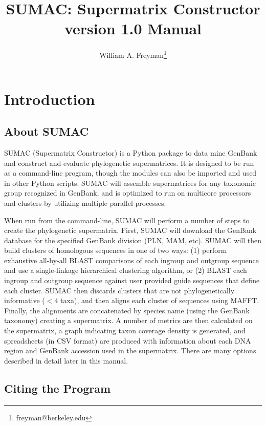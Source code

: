 \documentclass[10pt]{report}
\title{SUMAC: Supermatrix Constructor version 1.0 Manual}
\author{William A. Freyman\thanks{freyman@berkeley.edu}}
\affil{Department of Integrative Biology, University of California, Berkeley}
\date{}
\begin{document}
\maketitle

\tableofcontents


\chapter{Introduction}

\section{About SUMAC}

SUMAC (Supermatrix Constructor) is a Python package to 
data mine GenBank and construct
and evaluate phylogenetic supermatrices. 
It is designed to be run as a command-line program, though
the modules can also be imported and used in other Python scripts.
SUMAC will assemble
supermatrices for any taxonomic group recognized in GenBank,
and is optimized to run on multicore processors and clusters by utilizing multiple parallel processes.

When run from the command-line, SUMAC will perform a number of steps to create
the phylogenetic supermatrix. 
First, SUMAC will download the GenBank database for the specified GenBank division (PLN, MAM, etc).
SUMAC will then build clusters of homologous sequences in one of two ways:
(1) perform exhaustive all-by-all BLAST comparisons of each ingroup and outgroup sequence
and use a single-linkage hierarchical clustering algorithm, or
(2) BLAST each ingroup and outgroup sequence against user provided guide sequences
that define each cluster.
SUMAC then discards clusters that are not phylogenetically informative ($< 4$ taxa), 
and then aligns each cluster of sequences using MAFFT.
Finally, the alignments are concatenated by species name (using the GenBank taxonomy) 
creating a supermatrix. A number of metrics are then calculated on the supermatrix, 
a graph indicating taxon coverage density is generated, and spreadsheets (in CSV format)
are produced with information about each DNA region and GenBank accession used in 
the supermatrix. 
There are many options described in
detail later in this manual. 

\section{Citing the Program}
\end{document}
